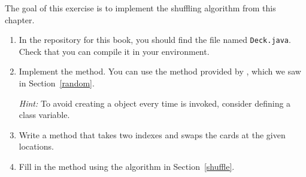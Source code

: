 \begin{exercise}  %
\label{ex.shuffle}

The goal of this exercise is to implement the shuffling algorithm from this chapter.

\begin{enumerate}


\item In the repository for this book, you should find the file named {\tt Deck.java}.
Check that you can compile it in your environment.

\item Implement the  method.
You can use the  method provided by , which we saw in Section~\ref{random}.

{\it Hint:} To avoid creating a  object every time  is invoked, consider defining a class variable.

\item Write a  method that takes two indexes and swaps the cards at the given locations.

\item Fill in the  method using the algorithm in Section~\ref{shuffle}.

\end{enumerate}

\end{exercise}


